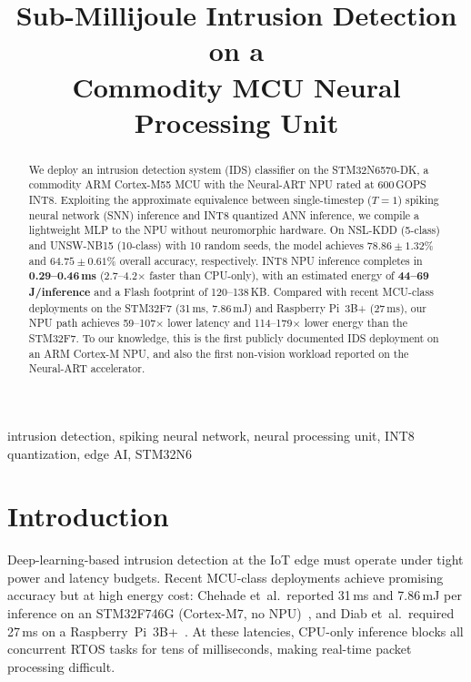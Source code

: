 \documentclass[conference]{IEEEtran}
\title{Sub-Millijoule Intrusion Detection on a\\Commodity MCU Neural Processing Unit}
\author{\IEEEauthorblockN{Anonymous}
\IEEEauthorblockA{Double-blind review}}
\begin{document}
\maketitle

\begin{abstract}
We deploy an intrusion detection system (IDS) classifier on the
STM32N6570-DK, a commodity ARM Cortex-M55 MCU with the Neural-ART NPU
rated at 600\,GOPS INT8.
Exploiting the approximate equivalence between single-timestep
($T{=}1$) spiking neural network (SNN) inference and INT8 quantized
ANN inference, we compile a lightweight MLP to the NPU without
neuromorphic hardware.
On NSL-KDD (5-class) and UNSW-NB15 (10-class) with 10
random seeds, the model achieves $78.86{\pm}1.32$\% and
$64.75{\pm}0.61$\% overall accuracy, respectively.
INT8 NPU inference completes in \textbf{0.29--0.46\,ms}
(2.7--4.2$\times$ faster than CPU-only), with an estimated energy
of \textbf{44--69\,\textmu J/inference} and a Flash footprint of
120--138\,KB.
Compared with recent MCU-class deployments on the STM32F7
(31\,ms, 7.86\,mJ) and Raspberry Pi~3B+ (27\,ms), our NPU path
achieves 59--107$\times$ lower latency and 114--179$\times$
lower energy than the STM32F7.
To our knowledge, this is the first publicly documented IDS
deployment on an ARM Cortex-M NPU, and also the first non-vision
workload reported on the Neural-ART accelerator.
\end{abstract}

\begin{IEEEkeywords}
intrusion detection, spiking neural network, neural processing unit,
INT8 quantization, edge AI, STM32N6
\end{IEEEkeywords}

\section{Introduction}
\label{sec:intro}

Deep-learning-based intrusion detection at the IoT edge must operate
under tight power and latency budgets.
Recent MCU-class deployments achieve promising accuracy but at high
energy cost: Chehade et~al.\ reported 31\,ms and 7.86\,mJ per
inference on an STM32F746G (Cortex-M7, no NPU)~\cite{chehade2025stm32},
and Diab et~al.\ required 27\,ms on a Raspberry~Pi~3B+~\cite{diab2025rpi}.
At these latencies, CPU-only inference blocks all concurrent RTOS tasks
for tens of milliseconds, making real-time packet processing difficult.
\end{document}
